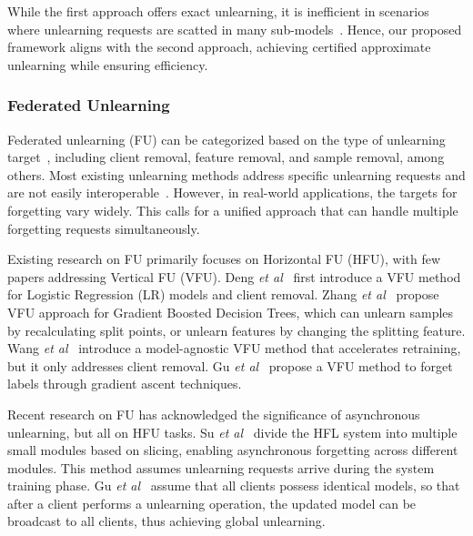 While the first approach offers exact unlearning, it is inefficient in scenarios where unlearning requests are scatted in many sub-models~\cite{warnecke2023machineunlearningfeatureslabels}. %
Hence, our proposed framework aligns with the second approach, achieving certified approximate unlearning while ensuring efficiency.

\subsubsection*{Federated Unlearning}

Federated unlearning (FU) can be categorized based on the type of unlearning target~\cite{nguyen2024surveymachineunlearning}, including client removal, feature removal, and sample removal, among others. Most existing unlearning methods address specific unlearning requests and are not easily interoperable~\cite{zhao2025exploringfederatedunlearninganalysis}. However, in real-world applications, the targets for forgetting vary widely. This calls for a unified approach that can handle multiple forgetting requests simultaneously.

Existing research on FU primarily focuses on Horizontal FU (HFU), with few papers addressing Vertical FU (VFU). Deng \textit{et al}~\cite{VFULR} first introduce a VFU method for Logistic Regression (LR) models and client removal. Zhang \textit{et al}~\cite{VFUGBDT} propose VFU approach for Gradient Boosted Decision Trees, which can unlearn samples by recalculating split points, or unlearn features by changing the splitting feature. Wang \textit{et al}~\cite{VFUFR} introduce a model-agnostic VFU method that accelerates retraining, but it only addresses client removal. %
Gu \textit{et al}~\cite{gu2024fewshotlabelunlearningvertical} propose a VFU method to forget labels through gradient ascent techniques.


Recent research on FU has acknowledged the significance of asynchronous unlearning, but all on HFU tasks. Su \textit{et al}~\cite{knot} divide the HFL system into multiple small modules based on slicing, enabling asynchronous forgetting across different modules. This method assumes unlearning requests arrive during the system training phase. Gu \textit{et al}~\cite{gu2025ferrarifederatedfeatureunlearning} assume that all clients possess identical models, so that after a client performs a unlearning operation, the updated model can be broadcast to all clients, thus achieving global unlearning. %

